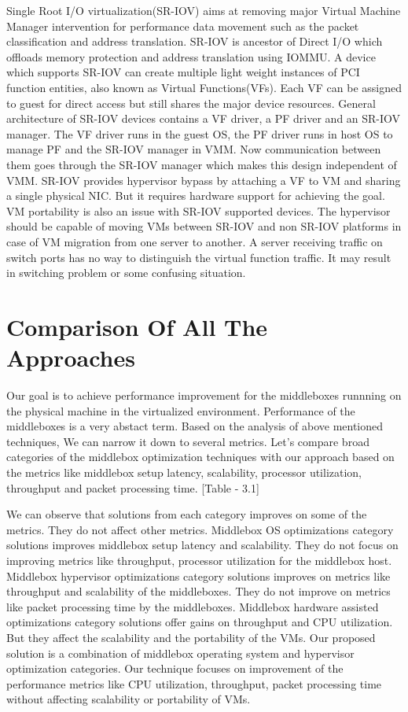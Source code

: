 \documentclass[a4paper,11pt]{report}
\begin{document}
Single Root I/O virtualization(SR-IOV)\cite{5416637} aims at removing major Virtual Machine Manager intervention for performance data movement such as the packet classification and address translation. SR-IOV is ancestor of Direct I/O which offloads memory protection and address translation using IOMMU. A device which supports SR-IOV can create multiple light weight instances of PCI function entities, also known as Virtual Functions(VFs). Each VF can be assigned to guest for direct access but still shares the major device resources. General architecture of SR-IOV devices contains a VF driver, a PF driver and an SR-IOV manager. The VF driver runs in the guest OS, the PF driver runs in host OS to manage PF and the SR-IOV manager in VMM. Now communication between them goes through the SR-IOV manager which makes this design independent of VMM. SR-IOV provides hypervisor bypass by attaching a VF to VM and sharing a single physical NIC. But it requires hardware support for achieving the goal. VM portability is also an issue with SR-IOV supported devices. The hypervisor should be capable of moving VMs between SR-IOV and non SR-IOV platforms in case of VM migration from one server to another. A server receiving traffic on switch ports has no way to distinguish the virtual function traffic. It may result in switching problem or some confusing situation.\cite{SR1}\cite{SR2} 

   	                       
\section{Comparison Of All The Approaches}
Our goal is to achieve performance improvement for the middleboxes runnning on the physical machine in the virtualized environment. Performance of the middleboxes is a very abstact term. Based on the analysis of above mentioned techniques,  We can narrow it down to several metrics. Let's compare broad categories of the middlebox optimization techniques with our approach based on the metrics like middlebox setup latency, scalability, processor utilization, throughput and packet processing time. [Table - 3.1]        

We can observe that solutions from each category improves on some of the metrics. They do not affect other metrics. Middlebox OS optimizations category solutions improves middlebox setup latency and scalability. They do not focus on improving metrics like throughput, processor utilization for the middlebox host. Middlebox hypervisor optimizations category solutions improves on metrics like throughput and scalability of the middleboxes. They do not improve on metrics like packet processing time by the middleboxes. Middlebox hardware assisted optimizations category solutions offer gains on throughput and CPU utilization. But they affect the scalability and the portability of the VMs. Our proposed solution is a combination of middlebox operating system and hypervisor optimization categories. Our technique focuses on improvement of the performance metrics like CPU utilization, throughput, packet processing time without affecting scalability or portability of VMs.
\end{document}
